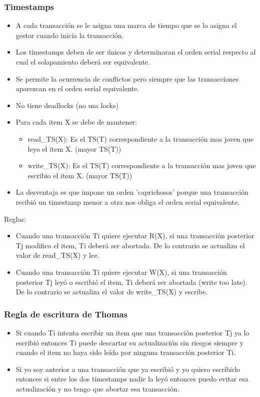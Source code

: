 \subsubsection*{Timestamps}
\begin{itemize}
\item A cada transacción se le asigna una marca de tiempo que se lo asigna el gestor cuando inicia la transacción.
\item Los timestamps deben de ser únicos y determinaran el orden serial respecto al cual el solapamiento deberá ser equivalente.
\item Se permite la ocurrencia de conflictos pero siempre que las transacciones aparezcan en el orden serial equivalente.
\item No tiene deadlocks (no usa locks)
\item Para cada item X se debe de mantener:
    \begin{itemize}
    \item read\_TS(X): Es el TS(T) correspondiente a la transacción mas joven que leyo el item X. (mayor TS(T))
    \item write\_TS(X): Es el TS(T) correspondiente a la transacción mas joven que escribio el item X. (mayor TS(T))
    \end{itemize}
\item La desventaja es que impone un orden 'caprichosos' porque una transacción recibió un timestamp menor a otra nos obliga el orden serial equivalente.
\end{itemize}

Reglas:
\begin{itemize}
\item Cuando una transacción Ti quiere ejecutar R(X), si una transacción posterior Tj modifico el item, Ti deberá ser abortada. De lo contrario se actualiza el valor de read\_TS(X) y lee.
\item Cuando una transacción Ti quiere ejecutar W(X), si una transacción posterior Tj leyó o escribió el item, Ti deberá ser abortada (write too late). De lo contrario se actualiza el valor de write\_TS(X) y escribe.
\end{itemize}



\subsubsection*{Regla de escritura de Thomas}
\begin{itemize}
\item Si cuando Ti intenta escribir un item que una transacción posterior Tj ya lo escribió entonces Ti puede descartar su actualización sin riesgos siempre y cuando el item no haya sido leído por ninguna transacción posterior Ti.
\item Si yo soy anterior a una transacción que ya escribió y yo quiero escribirlo entonces si entre los dos timestamps nadie la leyó entonces puedo evitar esa actualización y no tengo que abortar esa transacción.
\end{itemize}


